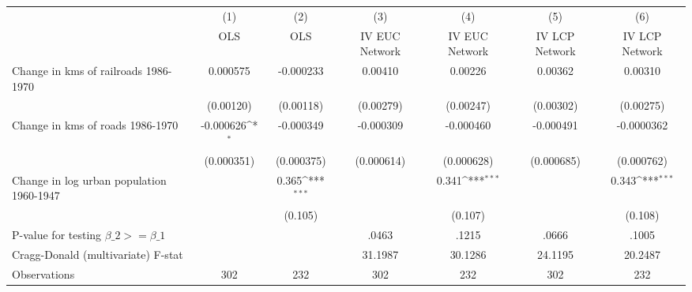 {
\def\sym#1{\ifmmode^{#1}\else\(^{#1}\)\fi}
\begin{tabular}{l*{6}{c}}
\hline\hline
                &\multicolumn{1}{c}{(1)}&\multicolumn{1}{c}{(2)}&\multicolumn{1}{c}{(3)}&\multicolumn{1}{c}{(4)}&\multicolumn{1}{c}{(5)}&\multicolumn{1}{c}{(6)}\\
                &\multicolumn{1}{c}{OLS}&\multicolumn{1}{c}{OLS}&\multicolumn{1}{c}{IV EUC Network}&\multicolumn{1}{c}{IV EUC Network}&\multicolumn{1}{c}{IV LCP Network}&\multicolumn{1}{c}{IV LCP Network}\\
\hline
Change in kms of railroads 1986-1970& 0.000575         &-0.000233         &  0.00410         &  0.00226         &  0.00362         &  0.00310         \\
                &(0.00120)         &(0.00118)         &(0.00279)         &(0.00247)         &(0.00302)         &(0.00275)         \\
[1em]
Change in kms of roads 1986-1970&-0.000626\sym{*}  &-0.000349         &-0.000309         &-0.000460         &-0.000491         &-0.0000362         \\
                &(0.000351)         &(0.000375)         &(0.000614)         &(0.000628)         &(0.000685)         &(0.000762)         \\
[1em]
Change in log urban population 1960-1947&                  &    0.365\sym{***}&                  &    0.341\sym{***}&                  &    0.343\sym{***}\\
                &                  &  (0.105)         &                  &  (0.107)         &                  &  (0.108)         \\
\hline
P-value for testing $\beta\_{2} >= \beta\_{1}$&                  &                  &    .0463         &    .1215         &    .0666         &    .1005         \\
Cragg-Donald (multivariate) F-stat&                  &                  &  31.1987         &  30.1286         &  24.1195         &  20.2487         \\
Observations    &      302         &      232         &      302         &      232         &      302         &      232         \\
\hline\hline
\end{tabular}
}
